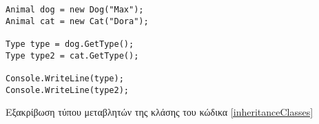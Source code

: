 \begin{listing}[htbp]
\begin{verbatim}
Animal dog = new Dog("Max");
Animal cat = new Cat("Dora");

Type type = dog.GetType();
Type type2 = cat.GetType();

Console.WriteLine(type);
Console.WriteLine(type2);
\end{verbatim}
\caption{Εξακρίβωση τύπου μεταβλητών της κλάσης του κώδικα \ref{inheritanceClasses}}
\label{reflectionInheritance}
\end{listing}